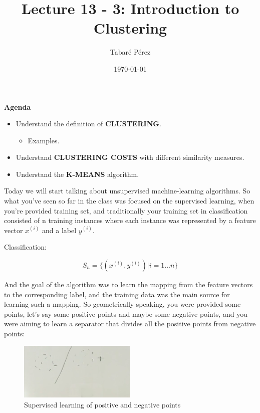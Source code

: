 \documentclass[a4paper, 12pt]{article}
\author{Tabaré Pérez}
\date{\today}
\title{Lecture 13 - 3: Introduction to Clustering}
\begin{document}
\maketitle
\textbf{Agenda}

\begin{itemize}
\item Understand the definition of \textbf{CLUSTERING}.
\begin{itemize}
\item Examples.
\end{itemize}
\item Understand \textbf{CLUSTERING COSTS} with different similarity measures.
\item Understand the \textbf{K-MEANS} algorithm.
\end{itemize}

Today we will start talking about unsupervised machine-learning algorithms. So
what you've seen so far in the class was focused on the supervised learning,
when you're provided training set, and traditionally your training set in
classification consisted of n training instances where each instance was
represented by a feature vector \(x^{(i)}\) and a label \(y^{(i)}\).

Classification:

\begin{equation}
S_n=\{(x^{(i)}, y^{(i)})|i=1 \ldots n\}
\end{equation}

And the goal of the algorithm was to learn the mapping from the feature vectors
to the corresponding label, and the training data was the main source for
learning such a mapping. So geometrically speaking, you were provided some
points, let's say some positive points and maybe some negative points, and you
were aiming to learn a separator that divides all the positive points from
negative points:

\begin{figure}[H]
\centering
\includegraphics[width=0.5\textwidth]{./pic/04-03-fig-01.png}
\caption{\label{fig:org8c4e252}Supervised learning of positive and negative points}
\end{figure}
\end{document}
